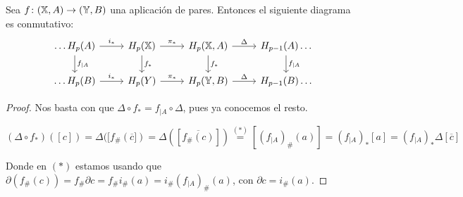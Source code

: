 \begin{proposition}
  Sea $f \colon ({\mathbb X}, A) \to ({\mathbb Y}, B)$ una aplicación de pares. Entonces el siguiente diagrama es conmutativo:
  \[  \begin{tikzcd}
    \dots H_p(A) \arrow{r}{i_*} \arrow{d}{f_{|A}} & H_p(\X) \arrow{r}{\pi_*} \arrow{d}{f_*} & H_p(\X, A) \arrow{r}{\Delta} \arrow{d}{f_*} & H_{p-1}(A) \dots \arrow{d}{f_{|A}} \\
    \dots H_p(B) \arrow{r}{i_*} & H_p(Y) \arrow{r}{\pi_*} & H_p(\Y, B) \arrow{r}{\Delta} & H_{p-1}(B) \dots
  \end{tikzcd} \]
\end{proposition}

\begin{proof}
  Nos basta con que $\Delta \circ f_* = f_{|A} \circ \Delta$, pues ya conocemos el resto.

  $
    (\Delta \circ f_*)([c]) = \Delta([f_\#(\overline{c}]) = \Delta([\overline{f_\#(c)}]) \stackrel{(*)}{=} [(f_{|A})_\#(a)]
    = (f_{|A})_*[a] = (f_{|A})_* \Delta[\overline{c}]
  $

  Donde en $(*)$ estamos usando que $\partial(f_\#(c)) = f_\# \partial c = f_\# i_\#(a) = i_\#(f_{|A})_\#(a)$, con $\partial c = i_\#(a).$
\end{proof}

